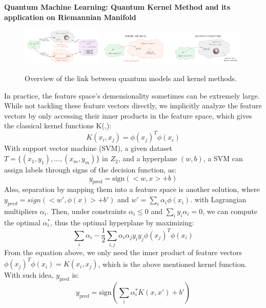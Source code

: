 \documentclass{article}
\begin{document}
\textbf{Quantum Machine Learning: Quantum Kernel Method and its
application on Riemannian Manifold}
\begin{figure}[h]
  \begin{center}
    \includegraphics[width=0.35\textwidth]{kernel1.png}
    \includegraphics[width=0.63\textwidth]{kernel2.png}    
  \end{center}
  \caption{Overview of the link between quantum models 
  and kernel methods.}
\end{figure}
In practice, the feature space's demensionality 
sometimes can be extremely large. While not 
tackling these feature vectors directly, we 
implicitly analyze the feature vectors by 
only accessing their inner products in the 
feature space, which gives the classical kernel functions K(,):
\begin{equation}
  K(x_i, x_j) = \phi(x_j)^T \phi(x_i)
\end{equation}
With support vector machine (SVM), a given dataset 
$T = \{ (x_1, y_1), ..., (x_m, y_m)\}$ in $Z_2$, and 
a hyperplane $(w,b)$, a SVM can assign labels through
signs of the decision function, as:
\begin{equation}
  y_{\text{pred}} = \text{sign} ( <w,x> +b)
\end{equation}
Also, separation by mapping them into a feature space
is another solution, where $y_{pred} = sign( <w', \phi(x)> +b')$ and 
$w' = \sum_i \alpha_i \phi(x_i)$. with Lagrangian multipliers 
$\alpha_i$. Then, under constraints $\alpha_i \leq 0 $ and 
$\sum_i y_i \alpha_i = 0$, we can compute the optimal 
$\alpha_i^{*}$, thus the optimal hyperplane by maximizing: 
\begin{equation}
  \sum_i \alpha_i - \frac{1}{2} \sum_{i, j} \alpha_i \alpha_j y_i y_j 
  \phi(x_j)^T \phi(x_i)
\end{equation}
From the equation above, we only need the inner product of feature 
vectors $\phi(x_j)^T \phi(x_i) = K(x_i, x_j)$, which is the above 
mentioned kernel function. With such idea, $y_{\text{pred}}$ is: 
\begin{equation}
  y_{ \text{pred}} = \text{sign} ( \sum_i \alpha_i^* K(x,x') +b')
\end{equation}
\end{document}
